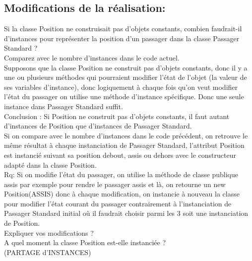 \documentclass{article}
\begin{document}
\subsection{Modifications de la réalisation: }
Si la classe Position ne construisait pas d’objets constants, combien faudrait-il d’instances pour représenter la position d’un passager dans la classe Passager Standard ?
\\
Comparez avec le nombre d’instances dans le code actuel.
\\
Supposons que la classe Position ne construit pas d’objets constants, donc il y a une ou
plusieurs méthodes qui pourraient modifier l’état de l’objet (la valeur de ses variables
d’instance), donc logiquement à chaque fois qu’on veut modifier l’état du passager on utilise une méthode d’instance spécifique. Donc une seule instance dans Passager Standard suffit.\\
Conclusion : Si Position ne construit pas d’objets constants, il faut autant d’instances de Position que d’instances de Passager Standard. \\
Si on compare avec le nombre d’instances dans le code précédent, on retrouve le même
résultat à chaque instanciation de Passager Standard, l'attribut Position est instancié suivant sa position debout, assis ou dehors avec le constructeur adapté dans la classe Position.\\
Rq: Si on modifie l’état du passager, on utilise la méthode de classe publique assis par
exemple pour rendre le passager assis et là, on retourne un new Position(ASSIS) donc à
chaque modification, on instancie à nouveau la classe pour modifier l’état courant du
passager contrairement à l’instanciation de Passager Standard initial où il faudrait choisir parmi les 3 soit une instanciation de Position.\\
\newline
\newline
Expliquer vos modifications ?\\
A quel moment la classe Position est-elle instanciée ?\\
(PARTAGE d'INSTANCES)
\par
\end{document}
